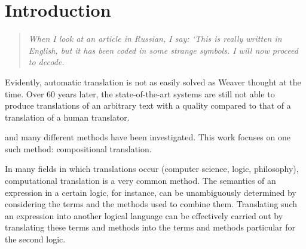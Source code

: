 \documentclass{report}
\author{}
\title{}
\theoremstyle{definition}
\theoremstyle{plain}
\begin{document}
\maketitle
\tableofcontents




\chapter{Introduction}




\begin{quote}
\textit{When I look at an article in Russian, I say: `This is really written in English, but it has been coded in some strange symbols. I will now proceed to decode.}
\end{quote}

Evidently, automatic translation is not as easily solved as Weaver thought at the time. Over 60 years later, the state-of-the-art systems are still not able to produce translations of an arbitrary text with a quality compared to that of a translation of a human translator.


and many different methods have been investigated. This work focuses on one such method: compositional translation.



In many fields in which translations occur (computer science, logic, philosophy), computational translation is a very common method. The semantics of an expression in a certain logic, for instance, can be unambiguously determined by considering the terms and the methods used to combine them. Translating such an expression into another logical language can be effectively carried out by translating these terms and methods into the terms and methods particular for the second logic.

\end{document}
